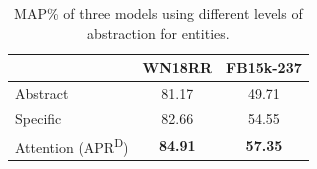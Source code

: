 \documentclass[letterpaper]{article} %
\begin{document}
%
%
%
%
%

\begin{table}[t]
\centering
\begin{tabular}{lcc}  
\toprule
& WN18RR & FB15k-237 \\
\midrule
Abstract   & 81.17 &  49.71  \\
Specific      & 82.66  &  54.55 \\
Attention (APR\textsuperscript{D}) & \textbf{84.91} & \textbf{57.35} \\
\bottomrule
\end{tabular}
\caption{MAP\% of three models using different levels of abstraction for entities.}
\label{tab:attention_effect}
\end{table}
\end{document}

